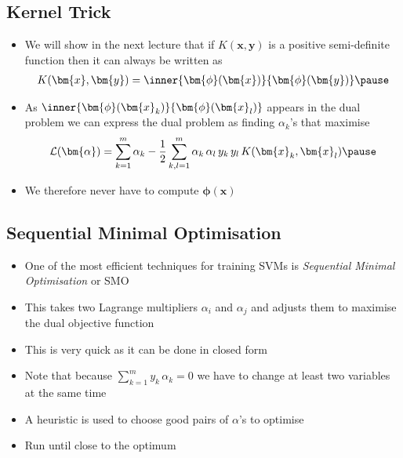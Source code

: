 \begin{slide}
\section{Kernel Trick}

\begin{PauseHighLight}
  \begin{itemize}
  \item We will show in the next lecture that if $K(\bm{x},\bm{y})$ is
    a positive semi-definite function then it can always be written as
    \begin{align*}
      K(\bm{x},\bm{y}) = \inner{\bm{\phi}(\bm{x})}{\bm{\phi}(\bm{y})}\pause
    \end{align*}
  \item As $\inner{\bm{\phi}(\bm{x}_k)}{\bm{\phi}(\bm{x}_l)}$ appears in the
    dual problem we can express the dual problem as finding
    $\alpha_k$'s that maximise
    \begin{align*}
      \mathcal{L}(\bm{\alpha}) = \sum_{k=1}^m \alpha_k 
      - \frac{1}{2} \sum_{k,l=1}^m \alpha_k\,\alpha_l
      \,y_k\,y_l\,K(\bm{x}_k,\bm{x}_l)\pause
    \end{align*}
  \item We therefore never have to compute $\bm{\phi}(\bm{x})$\pause
  \end{itemize}
\end{PauseHighLight}

\end{slide}



\begin{slide}
\section[-1]{Sequential Minimal Optimisation}

\begin{PauseHighLight}
  \begin{itemize}
  \item One of the most efficient techniques for training SVMs is
    \textit{Sequential Minimal Optimisation} or SMO\pause
  \item This takes two Lagrange multipliers $\alpha_i$ and $\alpha_j$
    and adjusts them to maximise the dual objective function\pause
  \item This is very quick as it can be done in closed form\pause
  \item Note that because $\sum\limits_{k=1}^m y_k\,\alpha_k = 0$ we
    have to change at least two variables at the same time\pause
  \item A heuristic is used to choose good pairs of $\alpha$'s to
    optimise\pause
  \item Run until close to the optimum\pause
  \end{itemize}
\end{PauseHighLight}

\end{slide}


